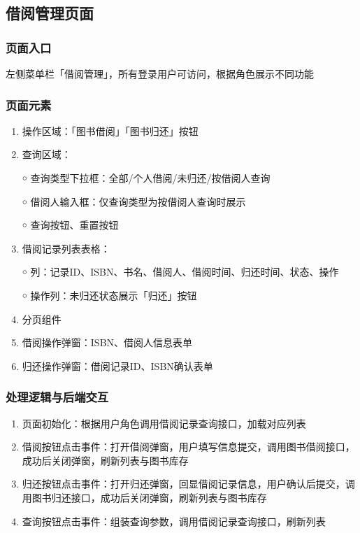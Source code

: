 \documentclass[12pt, a4paper]{article}
\begin{document}
\subsection{借阅管理页面}

\subsubsection{页面入口}

左侧菜单栏「借阅管理」，所有登录用户可访问，根据角色展示不同功能

\subsubsection{页面元素}

\begin{enumerate}
\item  操作区域：「图书借阅」「图书归还」按钮

\item  查询区域：

￮ 查询类型下拉框：全部/个人借阅/未归还/按借阅人查询

￮ 借阅人输入框：仅查询类型为按借阅人查询时展示

￮ 查询按钮、重置按钮

\item  借阅记录列表表格：

￮ 列：记录ID、ISBN、书名、借阅人、借阅时间、归还时间、状态、操作

￮ 操作列：未归还状态展示「归还」按钮

\item  分页组件

\item  借阅操作弹窗：ISBN、借阅人信息表单

\item  归还操作弹窗：借阅记录ID、ISBN确认表单
\end{enumerate}

\subsubsection{处理逻辑与后端交互}

\begin{enumerate}
\item  页面初始化：根据用户角色调用借阅记录查询接口，加载对应列表

\item  借阅按钮点击事件：打开借阅弹窗，用户填写信息提交，调用图书借阅接口，成功后关闭弹窗，刷新列表与图书库存

\item  归还按钮点击事件：打开归还弹窗，回显借阅记录信息，用户确认后提交，调用图书归还接口，成功后关闭弹窗，刷新列表与图书库存

\item  查询按钮点击事件：组装查询参数，调用借阅记录查询接口，刷新列表
\end{enumerate}
\end{document}
